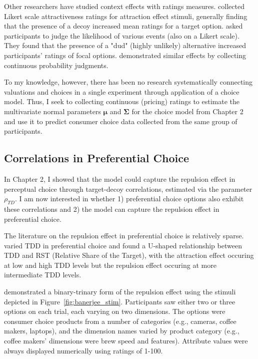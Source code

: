 Other researchers have studied context effects with ratings measures. \textcite{wedellUsingJudgmentsUnderstand} collected Likert scale attractiveness ratings for attraction effect stimuli, generally finding that the presence of a decoy increased mean ratings for a target option. \textcite{windschitl2004dud} asked participants to judge the likelihood of various events (also on a Likert scale). They found that the presence of a "dud" (highly unlikely) alternative increased participants' ratings of focal options. \textcite{caiWhenAlternativeHypotheses2023} demonstrated similar effects by collecting continuous probability judgments.

To my knowledge, however, there has been no research systematically connecting valuations and choices in a single experiment through application of a choice model. Thus, I seek to collecting continuous (pricing) ratings to estimate the multivariate normal parameters $\boldsymbol{\mu}$ and $\boldsymbol{\Sigma}$ for the choice model from Chapter 2 and use it to predict consumer choice data collected from the same group of participants.

\subsection{Correlations in Preferential Choice}
In Chapter 2, I showed that the model could capture the repulsion effect in perceptual choice \parencite{spektorWhenGoodLooks2018b} through target-decoy correlations, estimated via the parameter $\rho_{TD}$. I am now interested in whether 1) preferential choice options also exhibit these correlations and 2) the model can capture the repulsion effect in preferential choice. 

The literature on the repulsion effect in preferential choice is relatively sparse. \textcite{liaoInfluenceDistanceDecoy2021} varied TDD in preferential choice and found a U-shaped relationship between TDD and RST (Relative Share of the Target), with the attraction effect occuring at low and high TDD levels but the repulsion effect occuring at more intermediate TDD levels. 

\textcite{banerjeeFactorsThatPromote2024} demonstrated a binary-trinary form of the repulsion effect using the stimuli depicted in Figure~\ref{fig:banerjee_stim}. Participants saw either two or three options on each trial, each varying on two dimensions. The options were consumer choice products from a number of categories (e.g., cameras, coffee makers, laptops), and the dimension names varied by product category (e.g., coffee makers' dimensions were brew speed and features). Attribute values were always displayed numerically using ratings of 1-100.

